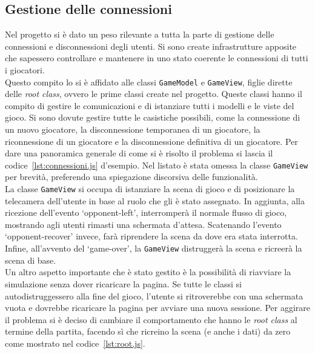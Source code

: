 \subsection{Gestione delle connessioni}
Nel progetto si è dato un peso rilevante a tutta la parte di gestione delle connessioni e disconnessioni degli utenti. Si sono create infrastrutture apposite che sapessero controllare
e mantenere in uno stato coerente le connessioni di tutti i giocatori.\\
Questo compito lo si è affidato alle classi \texttt{GameModel} e \texttt{GameView}, figlie dirette delle \textit{root class}, ovvero le prime classi create nel progetto.
Queste classi hanno il compito di gestire le comunicazioni e di istanziare tutti i modelli e le viste del gioco. Si sono dovute gestire tutte le casistiche possibili, come la 
connessione di un nuovo giocatore, la disconnessione temporanea di un giocatore, la riconnessione di un giocatore e la disconnessione definitiva di un giocatore. 
Per dare una panoramica generale di come si è risolto il problema si lascia il codice~\ref{lst:connessioni.js} d'esempio. Nel listato è stata omessa la classe \texttt{GameView} per 
brevità, preferendo una spiegazione discorsiva delle funzionalità.\\
La classe \texttt{GameView} si occupa di istanziare la scena di gioco e di posizionare la telecamera dell'utente in base al ruolo che gli è stato assegnato.
In aggiunta, alla ricezione dell'evento `opponent-left', interromperà il normale flusso di gioco, mostrando agli utenti rimasti una schermata d'attesa. Scatenando l'evento 
`opponent-recover' invece, farà riprendere la scena da dove era stata interrotta. Infine, all'avvento del `game-over', la \texttt{GameView} distruggerà la scena e ricreerà la scena
di base.\\
Un altro aspetto importante che è stato gestito è la possibilità di riavviare la simulazione senza dover ricaricare la pagina. Se tutte le classi si autodistruggessero alla fine del
gioco, l'utente si ritroverebbe con una schermata vuota e dovrebbe ricaricare la pagina per avviare una nuova sessione. Per aggirare il problema si è deciso di cambiare il 
comportamento che hanno le \textit{root class} al termine della partita, facendo sì che ricreino la scena (e anche i dati) da zero come mostrato nel codice~\ref{lst:root.js}.

